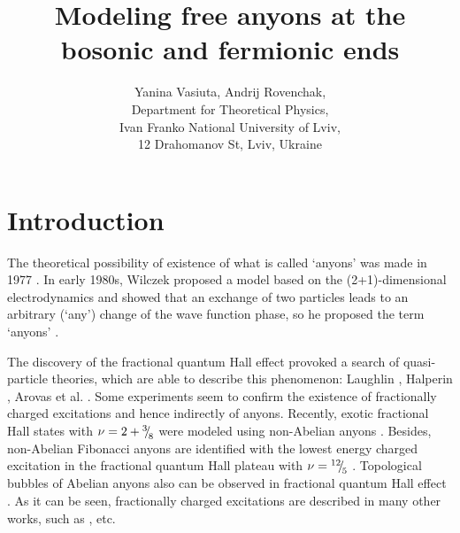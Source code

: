 \documentclass[12pt,a4paper]{article}
\begin{document}
\title{Modeling free anyons at the bosonic and fermionic ends}
\author{Yanina Vasiuta, Andrij Rovenchak,\\[6pt]
Department for Theoretical Physics,\\
Ivan Franko National University of Lviv,\\
12 Drahomanov St, Lviv, Ukraine}

\maketitle




\section{Introduction}
The theoretical possibility of existence of what is called `anyons' was made in 1977 \cite{Leinaas&Myrheim:1977}. In early 1980s, Wilczek proposed a model based on the (2+1)-dimensional electrodynamics and showed that an exchange of two particles leads to an arbitrary (`any') change of the wave function phase, so he proposed the term `anyons' \cite{Wilczek:1982c}.

The discovery of the fractional quantum Hall effect \cite{Tsui_etal:1982} provoked a search of quasi-particle theories, which are able to describe this phenomenon: Laughlin \cite{Laughlin:1983}, Halperin \cite{Halperin:1984}, Arovas et al. \cite{Arovas_etal:1994}. Some experiments \cite{Wang_etal:1992,Camino_etal:2005} seem to confirm the existence of fractionally charged excitations and hence indirectly of anyons. Recently, exotic fractional Hall states with $\nu=2+{}^3{\mskip -5mu/\mskip -3mu}_8$ were modeled using non-Abelian anyons \cite{Hutasoit_etal:2017}. Besides, non-Abelian Fibonacci anyons are identified with the lowest energy charged excitation in the fractional quantum Hall plateau with  $\nu={}^{12}{\mskip -5mu/\mskip -3mu}_5$ \cite{Mong_etal:2017}. Topological bubbles of Abelian anyons also can be observed in fractional quantum Hall effect \cite{Han_etal:2016}. As it can be seen, fractionally charged excitations are described in many other works, such as \cite{Braggio_etal:2016,Rech_etal:2017}, etc. %
\end{document}
